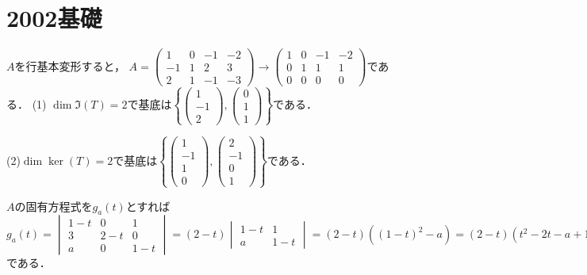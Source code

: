 \documentclass[
		book,
		head_space=20mm,
		foot_space=20mm,
		gutter=10mm,
		line_length=190mm
]{jlreq}
\begin{document}
\section{2002基礎}
$A$を行基本変形すると，
$A=\begin{pmatrix}
     1 & 0 & -1 & -2 \\
      -1 & 1 & 2 & 3 \\
     2 & 1 & -1 & -3 
    \end{pmatrix}\rightarrow
    \begin{pmatrix}
        1 & 0 & -1 & -2 \\
        0 & 1 & 1 & 1 \\
       0 & 0 & 0 & 0 
    \end{pmatrix}$である．
    (1)
    $\dim \Im(T)=2$で基底は$\left\{ \begin{pmatrix}
    1\\-1\\2
    \end{pmatrix},\begin{pmatrix}
    0\\1\\1
    \end{pmatrix} \right\}$である．

(2)$\dim \ker(T)=2$で基底は$\left\{ \begin{pmatrix}
1\\-1\\1\\0
\end{pmatrix},\begin{pmatrix}
2\\-1\\0\\1
\end{pmatrix} \right\}$である．

$A$の固有方程式を$g_a(t)$とすれば
$g_a(t)=\begin{vmatrix}
1-t& 0 & 1\\
3 & 2-t & 0\\
a & 0 & 1-t
\end{vmatrix}=(2-t)\begin{vmatrix}
1-t & 1\\
a & 1-t
\end{vmatrix}=(2-t)((1-t)^2-a)=(2-t)(t^2-2t-a+1)$である．
\end{document}
